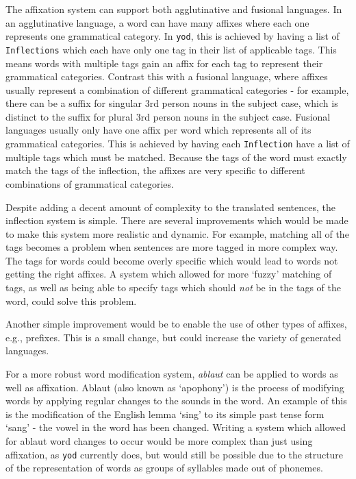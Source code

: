 \documentclass{report}
\begin{document}
	The affixation system can support both agglutinative and fusional languages. In an agglutinative language, a word can have many affixes where each one represents one grammatical category. In \texttt{yod}, this is achieved by having a list of \texttt{Inflections} which each have only one tag in their list of applicable tags. This means words with multiple tags gain an affix for each tag to represent their grammatical categories. Contrast this with a fusional language, where affixes usually represent a combination of different grammatical categories - for example, there can be a suffix for singular 3rd person nouns in the subject case, which is distinct to the suffix for plural 3rd person nouns in the subject case. Fusional languages usually only have one affix per word which represents all of its grammatical categories. This is achieved by having each \texttt{Inflection} have a list of multiple tags which must be matched. Because the tags of the word must exactly match the tags of the inflection, the affixes are very specific to different combinations of grammatical categories.

	Despite adding a decent amount of complexity to the translated sentences, the inflection system is simple. There are several improvements which would be made to make this system more realistic and dynamic. For example, matching all of the tags becomes a problem when sentences are more tagged in more complex way. The tags for words could become overly specific which would lead to words not getting the right affixes. A system which allowed for more `fuzzy' matching of tags, as well as being able to specify tags which should \textit{not} be in the tags of the word, could solve this problem. 
	
	Another simple improvement would be to enable the use of other types of affixes, e.g., prefixes. This is a small change, but could increase the variety of generated languages.
	
	For a more robust word modification system, \textit{ablaut} can be applied to words as well as affixation. Ablaut (also known as `apophony') is the process of modifying words by applying regular changes to the sounds in the word. An example of this is the modification of the English lemma `sing' to its simple past tense form `sang' - the vowel in the word has been changed. Writing a system which allowed for ablaut word changes to occur would be more complex than just using affixation, as \texttt{yod} currently does, but would still be possible due to the structure of the representation of words as groups of syllables made out of phonemes.
\end{document}

